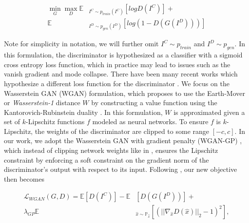 \documentclass[conference,reqno]{IEEEtran}
\begin{document}
\begin{equation}
\begin{aligned}
   \min\limits_{G}\max\limits_{D} \mathbb{E} & _{I^C \sim p_{train}(I^C)} [logD(I^C)] + \\
   \mathbb{E} & _{I^D \sim p_{gen}(I^D)}[log(1 - D(G(I^D)))]
\end{aligned}
\end{equation}

\noindent Note for simplicity in notation, we will further omit $I^C \sim p_{train}$ and $I^D \sim p_{gen}$. In this
formulation, the discriminator is hypothesized as a classifier with a sigmoid cross entropy loss function, which in
practice may lead to issues such as the vanish gradient and mode collapse. There have been many recent works which
hypothesize a different loss function for the discriminator
\cite{mao2016least,arjovsky2017wasserstein,gulrajani2017improved,zhao2016energy}. We focus on the Wasserstein GAN
(WGAN) \cite{arjovsky2017wasserstein} formulation, which proposes to use the Earth-Mover or \textit{Wasserstein-1}
distance $W$ by constructing a value function using the Kantorovich-Rubinstein duality \cite{villani2008optimal}.
In this formulation, $W$ is approximated given a set of $k$-Lipschitz functions $f$ modeled as neural networks. To
ensure $f$ is $k$-Lipschitz, the weights of the discriminator are clipped to some range $[-c, c]$. In our work, we
adopt the Wasserstein GAN with gradient penalty (WGAN-GP) \cite{gulrajani2017improved}, which instead of clipping
network weights like in \cite{arjovsky2017wasserstein}, ensures the Lipschitz constraint by enforcing a soft
constraint on the gradient norm of the discriminator's output with respect to its input. Following
\cite{gulrajani2017improved}, our new objective then becomes

\begin{equation}
\begin{aligned}
   \mathcal{L}_{WGAN}(G,D) = \mathbb{E} [D(I^C)] - \mathbb{E} & [D(G(I^D))] + \\
   \lambda_{GP} \mathbb{E} & _{\hat{x} \sim \mathbb{P}_{\hat{x}}} [(|| \nabla_{\hat{x}} D(\hat{x})||_2 -1)^2 ],
\end{aligned}
\end{equation}

\end{document}
